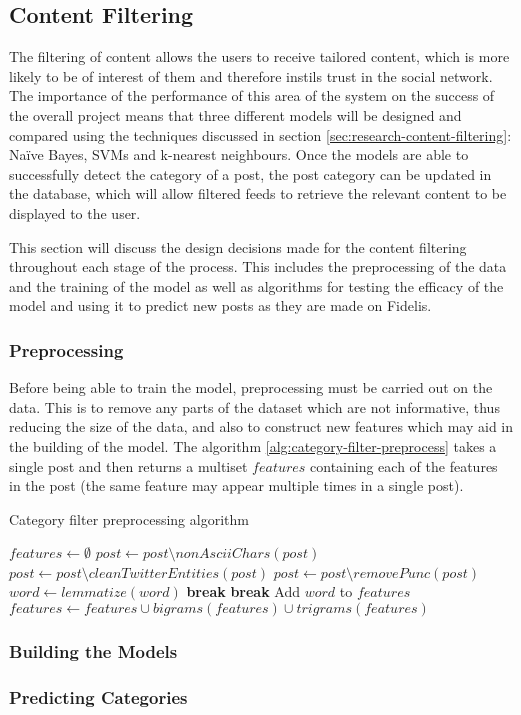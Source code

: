 \subsection{Content Filtering}
The filtering of content allows the users to receive tailored content, which is more likely to be of interest of them and therefore instils trust in the social network. The importance of the performance of this area of the system on the success of the overall project means that three different models will be designed and compared using the techniques discussed in section \ref{sec:research-content-filtering}: Na\"ive Bayes, SVMs and k-nearest neighbours. Once the models are able to successfully detect the category of a post, the post category can be updated in the database, which will allow filtered feeds to retrieve the relevant content to be displayed to the user. 

This section will discuss the design decisions made for the content filtering throughout each stage of the process. This includes the preprocessing of the data and the training of the model as well as algorithms for testing the efficacy of the model and using it to predict new posts as they are made on Fidelis.

\subsubsection{Preprocessing}
Before being able to train the model, preprocessing must be carried out on the data. This is to remove any parts of the dataset which are not informative, thus reducing the size of the data, and also to construct new features which may aid in the building of the model. The algorithm \ref{alg:category-filter-preprocess} takes a single post and then returns a multiset $features$ containing each of the features in the post (the same feature may appear multiple times in a single post). 

\begin{algorithm}
\caption{Category filter preprocessing algorithm}
\label{alg:category-filter-preprocess}
\begin{algorithmic}[1]
	\State $features\gets \emptyset$
	\State $post\gets post\setminus nonAsciiChars(post)$ 
	\State $post\gets post\setminus cleanTwitterEntities(post)$
	\State $post\gets post\setminus removePunc(post)$
		\State $word\gets lemmatize(word)$
			\State \textbf{break} 
		\EndIf
			\State \textbf{break} 
		\EndIf
		\State Add $word$ to $features$
	\EndFor
	\State $features\gets features\cup bigrams(features)\cup trigrams(features)$
	\State {}
\EndFunction
\end{algorithmic}
\end{algorithm}

\subsubsection{Building the Models}


\subsubsection{Predicting Categories}